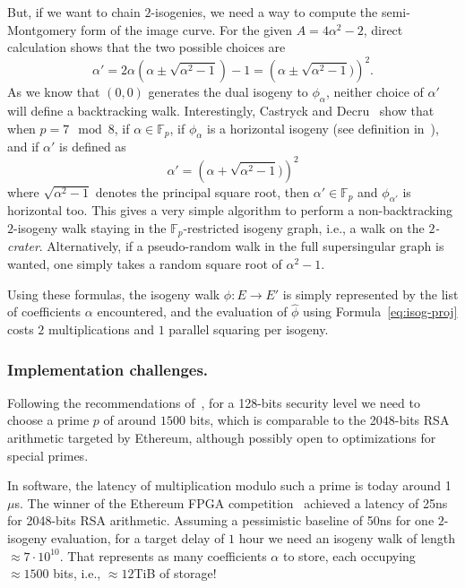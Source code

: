 \documentclass{llncs}
\newcommand{\F}{\mathbb{F}}
\begin{document}
But, if we want to chain $2$-isogenies, we need a way to compute the
semi-Montgomery form of the image curve. %
For the given $A=4\alpha^2-2$, direct calculation shows that the two
possible choices are
\begin{equation}
  \label{eq:next-curve}
  \alpha' = 2\alpha\left(\alpha \pm \sqrt{\alpha^2 - 1}\right) - 1
  = \left(\alpha \pm \sqrt{\alpha^2-1})\right)^2.
\end{equation}
As we know that $(0,0)$ generates the dual isogeny to $\phi_\alpha$,
neither choice of $\alpha'$ will define a backtracking walk. %
Interestingly, Castryck and Decru~\cite{10.1007/978-3-030-44223-1_7} show
that when $p=7\mod 8$, if $\alpha\in\F_p$, if $\phi_\alpha$ is a
horizontal isogeny (see definition in~\cite{10.1007/978-3-030-44223-1_7}),
and if $\alpha'$ is defined as
\[\alpha' = \left(\alpha + \sqrt{\alpha^2-1})\right)^2\]
where $\sqrt{\alpha^2-1}$ denotes the principal square root, then
$\alpha'\in\F_p$ and $\phi_{\alpha'}$ is horizontal too. %
This gives a very simple algorithm to perform a non-backtracking
$2$-isogeny walk staying in the $\F_p$-restricted isogeny graph, i.e.,
a walk on the \emph{$2$-crater}. %
Alternatively, if a pseudo-random walk in the full supersingular graph
is wanted, one simply takes a random square root of $\alpha^2-1$.

Using these formulas, the isogeny walk $\phi:E\to E'$ is simply
represented by the list of coefficients $\alpha$ encountered, and the
evaluation of $\hat\phi$ using Formula~\eqref{eq:isog-proj} costs $2$
multiplications and $1$ parallel squaring per isogeny.

\subsubsection{Implementation challenges.}
Following the recommendations of~\cite{10.1007/978-3-030-34578-5_10},
for a 128-bits security level we need to choose a prime $p$ of around
$1500$ bits, which is comparable to the 2048-bits RSA arithmetic
targeted by Ethereum, although possibly open to optimizations for
special primes.

In software, the latency of multiplication modulo such a prime is
today around 1$\mu$s. %
The winner of the Ethereum FPGA competition~\cite{ethereum-vdf}
achieved a latency of 25ns for 2048-bits RSA arithmetic. %
Assuming a pessimistic baseline of 50ns for one $2$-isogeny
evaluation, for a target delay of $1$ hour we need an isogeny walk of length
$\approx 7\cdot 10^{10}$. %
That represents as many coefficients $\alpha$ to store, each occupying
$\approx 1500$ bits, i.e., $\approx 12$TiB of storage!
\end{document}
